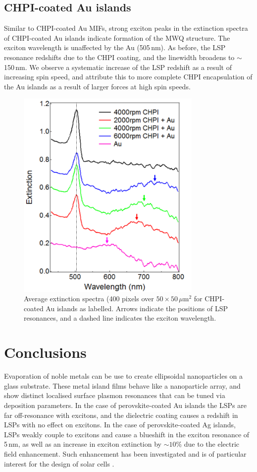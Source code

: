 \subsection{CHPI-coated Au islands}
Similar to CHPI-coated Au MIFs, strong exciton peaks in the extinction spectra of CHPI-coated Au islands indicate formation of the MWQ structure. The exciton wavelength is unaffected by the Au (505\,nm). As before, the LSP resonance redshifts due to the CHPI coating, and the linewidth broadens to $\sim$150\,nm. We observe a systematic increase of the LSP redshift as a result of increasing spin speed, and attribute this to more complete CHPI encapsulation of the Au islands as a result of larger forces at high spin speeds.
\begin{figure}[h!] 
\centering    
\includegraphics[width=0.8\textwidth]{Fig10}
\caption{Average extinction spectra (400 pixels over $50\times50\,\mu$m$^2$ for CHPI-coated Au islands as labelled. Arrows indicate the positions of LSP resonances, and a dashed line indicates the exciton wavelength.}
\label{6Fig10}
\end{figure}

\section{Conclusions}
Evaporation of noble metals can be use to create ellipsoidal nanoparticles on a glass substrate. These metal island films behave like a nanoparticle array, and show distinct localised surface plasmon resonances that can be tuned via deposition parameters. In the case of perovskite-coated Au islands the LSPs are far off-resonance with excitons, and the dielectric coating causes a redshift in LSPs with no effect on excitons. In the case of perovskite-coated Ag islands, LSPs weakly couple to excitons and cause a blueshift in the exciton resonance of 5\,nm, as well as an increase in exciton extinction by $\sim10$\% due to the electric field enhancement. Such enhancement has been investigated and is of particular interest for the design of solar cells \cite{Alemu2014, Zheng2011, Xu2013, Spinelli2012}.

